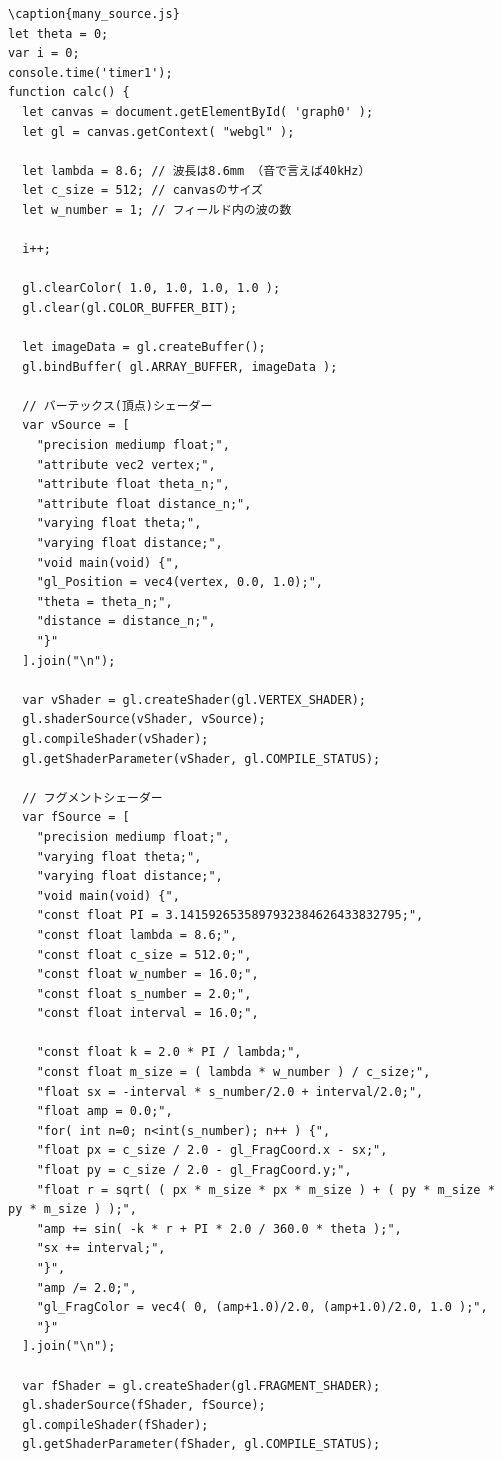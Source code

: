 \documentclass[a4j,12pt]{jsarticle}
\begin{document}
{\begin{lstlisting}
\end{lstlisting}
\newpage

\begin{lstlisting}
\caption{many_source.js}
let theta = 0;
var i = 0;
console.time('timer1');
function calc() {
  let canvas = document.getElementById( 'graph0' );
  let gl = canvas.getContext( "webgl" );

  let lambda = 8.6; // 波長は8.6mm （音で言えば40kHz）
  let c_size = 512; // canvasのサイズ
  let w_number = 1; // フィールド内の波の数

  i++;

  gl.clearColor( 1.0, 1.0, 1.0, 1.0 );
  gl.clear(gl.COLOR_BUFFER_BIT);

  let imageData = gl.createBuffer();
  gl.bindBuffer( gl.ARRAY_BUFFER, imageData );

  // バーテックス(頂点)シェーダー
  var vSource = [
    "precision mediump float;",
    "attribute vec2 vertex;",
    "attribute float theta_n;",
    "attribute float distance_n;",
    "varying float theta;",
    "varying float distance;",
    "void main(void) {",
    "gl_Position = vec4(vertex, 0.0, 1.0);",
    "theta = theta_n;",
    "distance = distance_n;",
    "}"
  ].join("\n");

  var vShader = gl.createShader(gl.VERTEX_SHADER);
  gl.shaderSource(vShader, vSource);
  gl.compileShader(vShader);
  gl.getShaderParameter(vShader, gl.COMPILE_STATUS);

  // フグメントシェーダー
  var fSource = [
    "precision mediump float;",
    "varying float theta;",
    "varying float distance;",
    "void main(void) {",
    "const float PI = 3.1415926535897932384626433832795;",
    "const float lambda = 8.6;",
    "const float c_size = 512.0;",
    "const float w_number = 16.0;",
    "const float s_number = 2.0;",
    "const float interval = 16.0;",

    "const float k = 2.0 * PI / lambda;",
    "const float m_size = ( lambda * w_number ) / c_size;",
    "float sx = -interval * s_number/2.0 + interval/2.0;",
    "float amp = 0.0;",
    "for( int n=0; n<int(s_number); n++ ) {",
    "float px = c_size / 2.0 - gl_FragCoord.x - sx;",
    "float py = c_size / 2.0 - gl_FragCoord.y;",
    "float r = sqrt( ( px * m_size * px * m_size ) + ( py * m_size * py * m_size ) );",
    "amp += sin( -k * r + PI * 2.0 / 360.0 * theta );",
    "sx += interval;",
    "}",
    "amp /= 2.0;",
    "gl_FragColor = vec4( 0, (amp+1.0)/2.0, (amp+1.0)/2.0, 1.0 );",
    "}"
  ].join("\n");

  var fShader = gl.createShader(gl.FRAGMENT_SHADER);
  gl.shaderSource(fShader, fSource);
  gl.compileShader(fShader);
  gl.getShaderParameter(fShader, gl.COMPILE_STATUS);



\end{lstlisting}}
\end{document}
